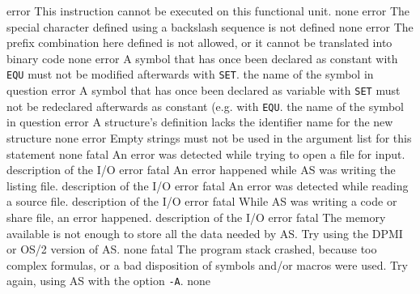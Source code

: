 \documentclass[12pt,twoside]{report}
\newcommand{\tty}[1]{{\tt #1}}
\begin{document}
\begin{description}
               {error}
               {This instruction cannot be executed on this functional
                unit.}
               {none}
               {error}
               {The special character defined using a backslash sequence
                is not defined}
               {none}
               {error}
               {The prefix combination here defined is not allowed, or it
                cannot be translated into binary code}
               {none}
               {error}
               {A symbol that has once been declared as constant with
                {\tt EQU} must not be modified afterwards with {\tt SET}.}
               {the name of the symbol in question}
               {error}
               {A symbol that has once been declared as variable with
                {\tt SET} must not be redeclared afterwards as constant
                (e.g. with {\tt EQU}.}
               {the name of the symbol in question}
               {error}
               {A structure's definition lacks the identifier name for the
                new structure}
               {none}
               {error}
               {Empty strings must not be used in the argument list for
                this statement}
               {none}
               {fatal}
               {An error was detected while trying to open a file for input.}
               {description of the I/O error}
               {fatal}
               {An error happened while AS was writing the listing file.}
               {description of the I/O error}
               {fatal}
               {An error was detected while reading a source file.}
               {description of the I/O error}
               {fatal}
               {While AS was writing a code or share file, an error happened.}
               {description of the I/O error}
               {fatal}
               {The memory available is not enough to store all the data
                needed by AS. Try using the DPMI or OS/2 version of AS.}
               {none}
               {fatal}
               {The program stack crashed, because too complex formulas, or
                a bad disposition of symbols and/or macros were used. Try
                again, using AS with the option \tty{-A}.}
               {none}
\end{description}
\end{document}
